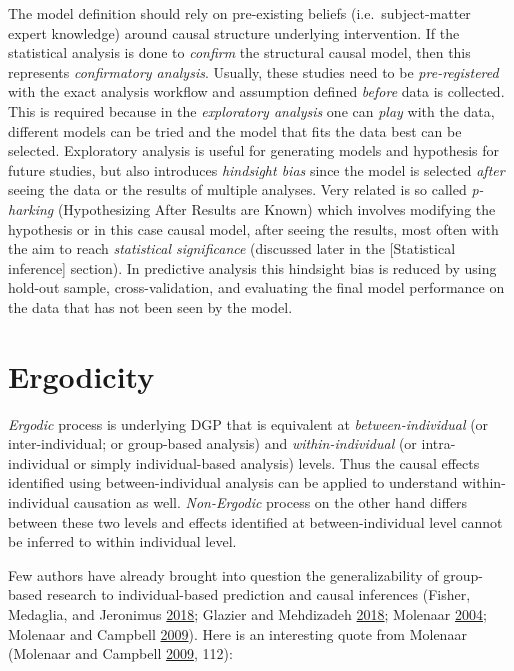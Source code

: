 \documentclass[
]{book}
\begin{document}
The model definition should rely on pre-existing beliefs (i.e.~subject-matter expert knowledge) around causal structure underlying intervention. If the statistical analysis is done to \emph{confirm} the structural causal model, then this represents \emph{confirmatory analysis}. Usually, these studies need to be \emph{pre-registered} with the exact analysis workflow and assumption defined \emph{before} data is collected. This is required because in the \emph{exploratory analysis} one can \emph{play} with the data, different models can be tried and the model that fits the data best can be selected. Exploratory analysis is useful for generating models and hypothesis for future studies, but also introduces \emph{hindsight bias} since the model is selected \emph{after} seeing the data or the results of multiple analyses. Very related is so called \emph{p-harking} (Hypothesizing After Results are Known) which involves modifying the hypothesis or in this case causal model, after seeing the results, most often with the aim to reach \emph{statistical significance} (discussed later in the {[}Statistical inference{]} section). In predictive analysis this hindsight bias is reduced by using hold-out sample, cross-validation, and evaluating the final model performance on the data that has not been seen by the model.

\hypertarget{ergodicity}{%
\section{Ergodicity}\label{ergodicity}}

\emph{Ergodic} process is underlying DGP that is equivalent at \emph{between-individual} (or inter-individual; or group-based analysis) and \emph{within-individual} (or intra-individual or simply individual-based analysis) levels. Thus the causal effects identified using between-individual analysis can be applied to understand within-individual causation as well. \emph{Non-Ergodic} process on the other hand differs between these two levels and effects identified at between-individual level cannot be inferred to within individual level.

Few authors have already brought into question the generalizability of group-based research to individual-based prediction and causal inferences (Fisher, Medaglia, and Jeronimus \protect\hyperlink{ref-fisherLackGrouptoindividualGeneralizability2018}{2018}; Glazier and Mehdizadeh \protect\hyperlink{ref-glazierChallengingConventionalParadigms2018}{2018}; Molenaar \protect\hyperlink{ref-molenaarManifestoPsychologyIdiographic2004}{2004}; Molenaar and Campbell \protect\hyperlink{ref-molenaarNewPersonSpecificParadigm2009}{2009}). Here is an interesting quote from Molenaar (Molenaar and Campbell \protect\hyperlink{ref-molenaarNewPersonSpecificParadigm2009}{2009}, 112):
\end{document}
